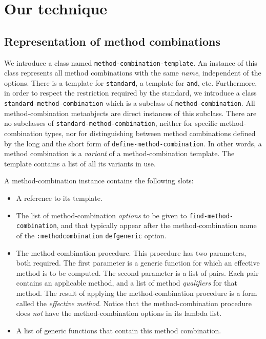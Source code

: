 \section{Our technique}

\subsection{Representation of method combinations}

We introduce a class named \texttt{method-combination-template}.  An
instance of this class represents all method combinations with the
same \emph{name}, independent of the options.  There is a template for
\texttt{standard}, a template for \texttt{and}, etc.  Furthermore, in
order to respect the restriction required by the standard, we
introduce a class \texttt{standard-method-combination} which is a
subclass of \texttt{method-combination}.  All method-combination
metaobjects are direct instances of this subclass.  There are no
subclasses of \texttt{standard-method-combination}, neither for
specific method-combination types, nor for distinguishing between
method combinations defined by the long and the short form of
\texttt{define-method-combination}.  In other words, a method
combination is a \emph{variant} of a method-combination template.  The
template contains a list of all its variants in use.

A method-combination instance contains the following slots:

\begin{itemize}
\item A reference to its template.
\item The list of method-combination \emph{options} to be given to
  \texttt{find-method-combination}, and that typically appear after
  the method-combination name of the \texttt{:method\-combination}
  \texttt{defgeneric} option.
\item The method-combination procedure.  This procedure has two
  parameters, both required.  The first parameter is a generic
  function for which an effective method is to be computed.  The
  second parameter is a list of pairs.  Each pair contains an
  applicable method, and a list of method \emph{qualifiers} for that
  method.  The result of applying the method-combination procedure is
  a form called the \emph{effective method}.  Notice that the
  method-combination procedure does \emph{not} have the
  method-combination options in its lambda list.
\item A list of generic functions that contain this method combination.
\end{itemize}

